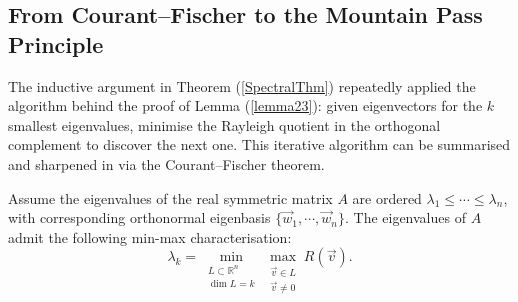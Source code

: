 \subsection{From Courant--Fischer to the Mountain Pass Principle}
The inductive argument in Theorem (\ref{SpectralThm}) repeatedly applied the algorithm behind the proof of Lemma (\ref{lemma23}): given eigenvectors for the $k$ smallest eigenvalues, minimise the Rayleigh quotient in the orthogonal complement to discover the next one. This iterative algorithm can be summarised and sharpened in via the Courant--Fischer theorem.

\begin{theorem}\label{CourantFischer}
 Assume the eigenvalues of the real symmetric matrix $A$ are ordered $\lambda_1 \leq \cdots \leq \lambda_n$, with corresponding orthonormal eigenbasis $\{\vec{w}_1,\cdots,\vec{w}_n\}$. The eigenvalues of $A$ admit the following min-max characterisation: $$\lambda_k=\min_{\substack{L\subset \mathbb{R}^n\\ \dim L = k}} \max_{\substack{\vec{v}\in L\\ \vec{v}\neq 0}} R(\vec{v}).$$
\end{theorem}
